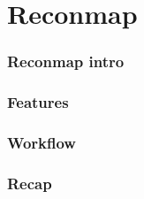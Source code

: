\documentclass{beamer}
\begin{document}
\section{Reconmap}

\begin{frame}
    \frametitle{Reconmap intro}

    \note[item]{
    }
\end{frame}

\begin{frame}
    \frametitle{Features}

    \note[item]{
    }
\end{frame}

\begin{frame}
    \frametitle{Workflow}

    \note[item]{
    }
\end{frame}

\begin{frame}
    \frametitle{Recap}

    \note[item]{
    }

    \tableofcontents
\end{frame}
\end{document}
